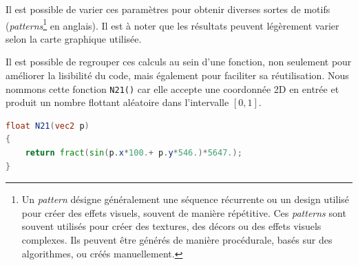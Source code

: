Il est possible de varier ces paramètres pour obtenir diverses sortes de motifs (\textit{patterns}\footnote{Un \textit{pattern} désigne généralement une séquence récurrente ou un design utilisé pour créer des effets visuels, souvent de manière répétitive. Ces \textit{patterns} sont souvent utilisés pour créer des textures, des décors ou des effets visuels complexes. Ils peuvent être générés de manière procédurale, basés sur des algorithmes, ou créés manuellement.} en anglais). Il est à noter que les résultats peuvent légèrement varier selon la carte graphique utilisée.

Il est possible de regrouper ces calculs au sein d'une fonction, non seulement pour améliorer la lisibilité du code, mais également pour faciliter sa réutilisation. Nous nommons cette fonction \lstinline{N21()} car elle accepte une coordonnée 2D en entrée et produit un nombre flottant aléatoire dans l'intervalle $[0, 1]$.

\begin{minipage}{\linewidth}
\begin{lstlisting}[language=GLSL, caption=Random bidimensionnel,captionpos=b,frame=single]
float N21(vec2 p)
{
    return fract(sin(p.x*100.+ p.y*546.)*5647.);
}
\end{lstlisting}
\end{minipage}


